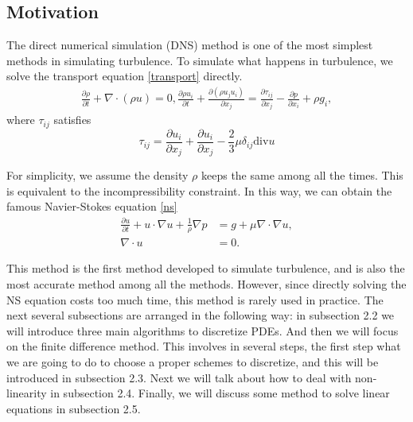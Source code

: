 \documentclass[english, nochinese]{pkupaper}
\begin{document}
\subsection{Motivation}
\par The direct numerical simulation (DNS) method is one of the most simplest methods in simulating turbulence. To simulate what happens in turbulence, we solve the transport equation \ref{transport} directly. \begin{equation}\label{transport}
	\begin{aligned}
		\frac{\partial\rho}{\partial t} + \nabla\cdot(\rho u) = 0,
		\frac{\partial\rho u_i}{\partial t} + \frac{\partial(\rho u_ju_i)}{\partial x_j} = \frac{\partial\tau_{ij}}{\partial x_j} - \frac{\partial p}{\partial x_i} + \rho g_i,
	\end{aligned}
\end{equation}
where $\tau_{ij}$ satisfies
\begin{equation}
	\tau_{ij} = \frac{\partial u_i}{\partial x_j} + \frac{\partial u_i}{\partial x_j} - \frac{2}{3}\mu\delta_{ij}\mathrm{div} u
\end{equation}

\par For simplicity, we assume the density $\rho$ keeps the same among all the times. This is equivalent to the incompressibility constraint. In this way, we can obtain the famous Navier-Stokes equation \eqref{ns}
\begin{equation}\label{ns}
	\begin{aligned}
		\frac{\partial u}{\partial t} + u\cdot\nabla u + \frac{1}{\rho}\nabla p & = g + \mu\nabla\cdot\nabla u,\\
		\nabla\cdot u & = 0.  
	\end{aligned}
\end{equation}
\par This method is the first method developed to simulate turbulence, and is also the most accurate method among all the methods. However, since directly solving the NS equation costs too much time, this method is rarely used in practice. The next several subsections are arranged in the following way: in subsection 2.2 we will introduce three main algorithms to discretize PDEs. And then we will focus on the finite difference method. This involves in several steps, the first step what we are going to do to choose a proper schemes to discretize, and this will be introduced in subsection 2.3. Next we will talk about how to deal with non-linearity in subsection 2.4. Finally, we will discuss some method to solve linear equations in subsection 2.5.
\end{document}
